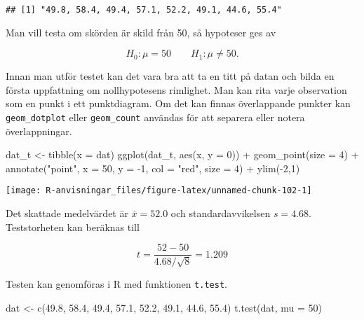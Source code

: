 \documentclass[
]{book}
\newenvironment{Shaded}{\begin{snugshade}}{\end{snugshade}}
\newcommand{\AttributeTok}[1]{\textcolor[rgb]{0.77,0.63,0.00}{#1}}
\newcommand{\DecValTok}[1]{\textcolor[rgb]{0.00,0.00,0.81}{#1}}
\newcommand{\FloatTok}[1]{\textcolor[rgb]{0.00,0.00,0.81}{#1}}
\newcommand{\FunctionTok}[1]{\textcolor[rgb]{0.00,0.00,0.00}{#1}}
\newcommand{\NormalTok}[1]{#1}
\newcommand{\OtherTok}[1]{\textcolor[rgb]{0.56,0.35,0.01}{#1}}
\newcommand{\SpecialCharTok}[1]{\textcolor[rgb]{0.00,0.00,0.00}{#1}}
\newcommand{\StringTok}[1]{\textcolor[rgb]{0.31,0.60,0.02}{#1}}
\theoremstyle{definition}
\theoremstyle{definition}
\theoremstyle{definition}
\theoremstyle{definition}
\theoremstyle{remark}
\begin{document}
\begin{verbatim}
## [1] "49.8, 58.4, 49.4, 57.1, 52.2, 49.1, 44.6, 55.4"
\end{verbatim}

Man vill testa om skörden är skild från 50, så hypoteser ges av

\[H_0: \mu = 50 \qquad H_1: \mu \neq 50.\]

Innan man utför testet kan det vara bra att ta en titt på datan och bilda en första uppfattning om nollhypotesens rimlighet. Man kan rita varje observation som en punkt i ett punktdiagram. Om det kan finnas överlappande punkter kan \texttt{geom\_dotplot} eller \texttt{geom\_count} användas för att separera eller notera överlappningar.

\begin{Shaded}
\begin{Highlighting}[]
\NormalTok{dat\_t }\OtherTok{\textless{}{-}} \FunctionTok{tibble}\NormalTok{(}\AttributeTok{x =}\NormalTok{ dat)}
\FunctionTok{ggplot}\NormalTok{(dat\_t, }\FunctionTok{aes}\NormalTok{(x, }\AttributeTok{y =} \DecValTok{0}\NormalTok{)) }\SpecialCharTok{+}
  \FunctionTok{geom\_point}\NormalTok{(}\AttributeTok{size =} \DecValTok{4}\NormalTok{) }\SpecialCharTok{+}
  \FunctionTok{annotate}\NormalTok{(}\StringTok{"point"}\NormalTok{, }\AttributeTok{x =} \DecValTok{50}\NormalTok{, }\AttributeTok{y =} \SpecialCharTok{{-}}\DecValTok{1}\NormalTok{, }\AttributeTok{col =} \StringTok{"red"}\NormalTok{, }\AttributeTok{size =} \DecValTok{4}\NormalTok{) }\SpecialCharTok{+}
  \FunctionTok{ylim}\NormalTok{(}\SpecialCharTok{{-}}\DecValTok{2}\NormalTok{,}\DecValTok{1}\NormalTok{)}
\end{Highlighting}
\end{Shaded}

\begin{center}\texttt{[image: R-anvisningar\_files/figure-latex/unnamed-chunk-102-1]} \end{center}

Det skattade medelvärdet är \(\bar x = 52.0\) och standardavvikelsen \(s = 4.68\). Teststorheten kan beräknas till

\[t = \frac{52 - 50}{4.68 / \sqrt 8} = 1.209\]

Testen kan genomföras i R med funktionen \texttt{t.test}.

\begin{Shaded}
\begin{Highlighting}[]
\NormalTok{dat }\OtherTok{\textless{}{-}} \FunctionTok{c}\NormalTok{(}\FloatTok{49.8}\NormalTok{, }\FloatTok{58.4}\NormalTok{, }\FloatTok{49.4}\NormalTok{, }\FloatTok{57.1}\NormalTok{, }\FloatTok{52.2}\NormalTok{, }\FloatTok{49.1}\NormalTok{, }\FloatTok{44.6}\NormalTok{, }\FloatTok{55.4}\NormalTok{)}
\FunctionTok{t.test}\NormalTok{(dat, }\AttributeTok{mu =} \DecValTok{50}\NormalTok{)}
\end{Highlighting}
\end{Shaded}
\end{document}
